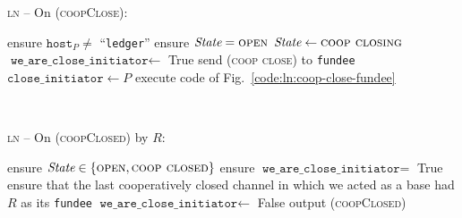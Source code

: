 \begin{center}
  \begin{processbox}{\textsc{ln} -- On (\textsc{coopClose}):}
    \begin{algorithmic}[1]
      \State ensure $\texttt{host}_P \neq$ ``\texttt{ledger}''
      \State ensure $\itistate = \textsc{open}$
      \State $\itistate \gets \textsc{coop closing}$
       
        \State $\texttt{we\_are\_close\_initiator} \gets$ True
        \State send (\textsc{coop close}) to \texttt{fundee}
      \Else \: 
        \State $\texttt{close\_initiator} \gets P$
        \State execute code of Fig.~\ref{code:ln:coop-close-fundee}
        \label{code:ln:coop-close:goto}
      \EndIf
    \end{algorithmic}
  \end{processbox}
  \label{code:ln:coop-close}
\end{center} \ \\

\begin{center}
  \begin{processbox}{\textsc{ln} -- On (\textsc{coopClosed}) by $R$:}
    \begin{algorithmic}[1]
      \State ensure $\itistate \in \{\textsc{open}, \textsc{coop closed}\}$
      \State ensure $\texttt{we\_are\_close\_initiator} =$ True
      \State ensure that the last cooperatively closed channel in which we acted
      as a base had $R$ as its \texttt{fundee}
      \State $\texttt{we\_are\_close\_initiator} \gets$ False
      \State output (\textsc{coopClosed})
    \end{algorithmic}
  \end{processbox}
  \label{code:ln:coop-closed-to-initiator}
\end{center} \ \\

